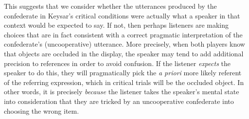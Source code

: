 \documentclass[manuscript]{stjour}
\begin{document}
This suggests that we consider whether the utterances produced by the confederate in Keysar's critical conditions were actually what a speaker in that context would be expected to say. 
If not, then perhaps listeners are making choices that are in fact consistent with a correct pragmatic interpretation of the confederate's (uncooperative) utterance.
More precisely, when both players know that objects are occluded in the display, the speaker may tend to add additional precision to references in order to avoid confusion. If the listener \emph{expects} the speaker to do this, they will pragmatically pick the \emph{a priori} more likely referent of the referring expression, which in critical trials will be the occluded object. In other words, it is precisely \emph{because} the listener takes the speaker's mental state into consideration that they are tricked by an uncooperative confederate into choosing the wrong item. 
%
\end{document}
